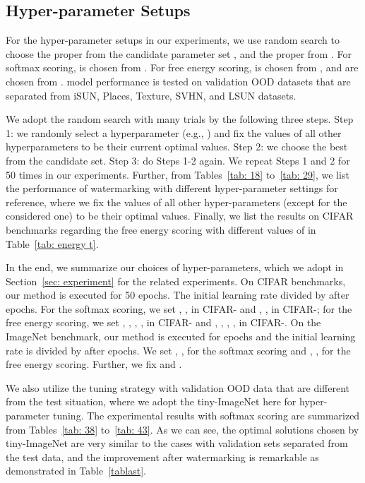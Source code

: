 \documentclass{article}
\begin{document}
\subsection{Hyper-parameter Setups}
\label{app: hyper-parameter}


For the hyper-parameter setups in our experiments, we use random search to choose the proper  from the candidate parameter set , and the proper  from . For softmax scoring,  is chosen from . For free energy scoring,  is chosen from , and  are chosen from . model performance is tested on validation OOD datasets that are separated from iSUN, Places, Texture, SVHN, and LSUN datasets. 

{We adopt the random search with many trials by the following three steps. Step 1: we randomly select a hyperparameter (e.g., ) and fix the values of all other hyperparameters to be their current optimal values. Step 2: we choose the best  from the candidate set. Step 3: do Steps 1-2 again. We repeat Steps 1 and 2 for 50 times in our experiments. Further, from Tables~\ref{tab: 18} to~\ref{tab: 29}, we list the performance of watermarking with different hyper-parameter settings for reference, where we fix the values of all other hyper-parameters (except for the considered one) to be their optimal values}. {Finally, we list the results on CIFAR benchmarks regarding the free energy scoring with different values of  in Table~\ref{tab: energy t}.}

In the end, we summarize our choices of hyper-parameters, which we adopt in Section~\ref{sec: experiment} for the related experiments. On CIFAR benchmarks, our method is executed for 50 epochs. The initial learning rate  divided by  after  epochs. For the softmax scoring, we set , ,  in CIFAR- and , ,  in CIFAR-; for the free energy scoring, we set , , , ,  in CIFAR- and , , , ,  in CIFAR-. On the ImageNet benchmark, our method is executed for  epochs and the initial learning rate  is divided by  after  epochs. We set , ,  for the softmax scoring and , ,    for the free energy scoring. Further, we fix  and . 

We also utilize the tuning strategy with validation OOD data that are different from the test situation, where we adopt the tiny-ImageNet here for hyper-parameter tuning. The experimental results with softmax scoring are summarized from Tables~\ref{tab: 38} to~\ref{tab: 43}. As we can see, the optimal solutions chosen by tiny-ImageNet are very similar to the cases with validation sets separated from the test data, and the improvement after watermarking is remarkable as demonstrated in Table~\ref{tablast}. 
\end{document}
